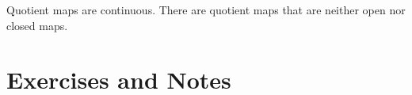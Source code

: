 \begin{remark}
    Quotient maps are continuous. There are quotient maps that are neither open nor closed maps.
\end{remark}
\newpage
\section{Exercises and Notes}